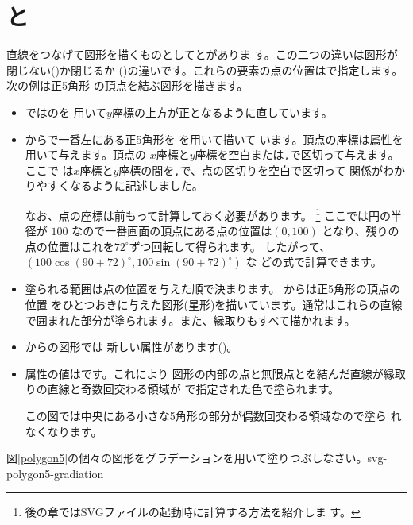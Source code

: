 \section{と}
直線をつなげて図形を描くものとしてとがありま
す。この二つの違いは図形が閉じない()か閉じるか
()の違いです。これらの要素の点の位置はで指定します。
次の例は正5角形
の頂点を結ぶ図形を描きます。
{}
\begin{itemize}
 \item {}ではのを
       用いて$y$座標の上方が正となるように直しています。
 \item {}からで一番左にある正5角形を
       を用いて描いて
       います。頂点の座標は属性を用いて与えます。頂点の
       $x$座標と$y$座標を空白または\texttt{,}で区切って与えます。ここで
       は$x$座標と$y$座標の間を\texttt{,}で、点の区切りを空白で区切って
       関係がわかりやすくなるように記述しました。

      なお、点の座標は前もって計算しておく必要があります。
\footnote{後の章ではSVGファイルの起動時に計算する方法を紹介しま
       す。}
ここでは円の半径が $100$ なので一番画面の頂点にある点の位置は$(0,100)$
       となり、残りの点の位置はこれを$72^{\circ}$ずつ回転して得られます。
       したがって、$(100\cos(90+72)^{\circ},100\sin(90+72)^{\circ})$ な
       どの式で計算できます。
 \item 塗られる範囲は点の位置を与えた順で決まります。
       からは正5角形の頂点の位置
       をひとつおきに与えた図形(星形)を描いています。通常はこれらの直線
       で囲まれた部分が塗られます。また、縁取りもすべて描かれます。
 \item {}からの図形では
       新しい属性があります()。
 \item 属性の値はです。これにより
       図形の内部の点と無限点とを結んだ直線が縁取りの直線と奇数回交わる領域が
       で指定された色で塗られます。

       この図では中央にある小さな5角形の部分が偶数回交わる領域なので塗ら
       れなくなります。
\end{itemize}
{図\ref{polygon5}の個々の図形をグラデーションを用いて塗りつぶしなさい。}{svg-polygon5-gradiation}

